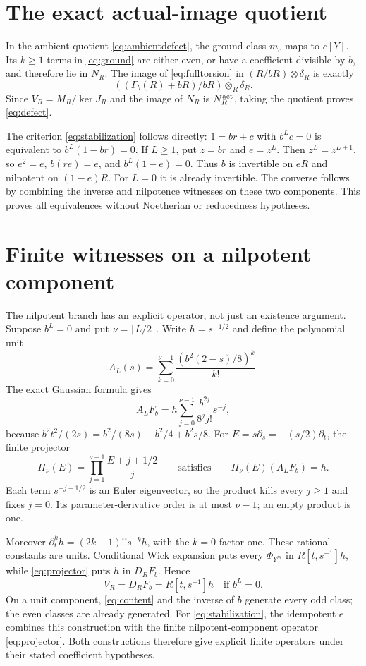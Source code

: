 \documentclass[11pt]{article}
\theoremstyle{definition}\newtheorem{definition}[theorem]{Definition}
\theoremstyle{remark}\newtheorem{remark}[theorem]{Remark}
\begin{document}
\section{The exact actual-image quotient}

In the ambient quotient \eqref{eq:ambientdefect}, the ground
class $m_c$ maps to $c[Y]$. Its $k\ge1$ terms in
\eqref{eq:ground} are either even, or have a coefficient
divisible by $b$, and therefore lie in $N_R$.
The image of \eqref{eq:fulltorsion} in
$(R/bR)\otimes\delta_R$ is exactly
\[
 ((\Gamma_b(R)+bR)/bR)\otimes_R\delta_R.
\]
Since $V_R=M_R/\ker J_R$ and the image of $N_R$ is
$N_R^{\rm act}$, taking the quotient proves
\eqref{eq:defect}.

The criterion \eqref{eq:stabilization} follows directly:
$1=br+c$ with $b^Lc=0$ is equivalent to
$b^L(1-br)=0$. If $L\ge1$, put $z=br$ and $e=z^L$.
Then $z^L=z^{L+1}$, so $e^2=e$, $b(re)=e$, and
$b^L(1-e)=0$. Thus $b$ is invertible on $eR$ and nilpotent
on $(1-e)R$. For $L=0$ it is already invertible. The converse
follows by combining the inverse and nilpotence witnesses on
these two components. This proves all equivalences without
Noetherian or reducedness hypotheses.

\section{Finite witnesses on a nilpotent component}

The nilpotent branch has an explicit operator, not just an
existence argument. Suppose $b^L=0$ and put
$\nu=\lceil L/2\rceil$. Write $h=s^{-1/2}$ and define the
polynomial unit
\[
 A_L(s)=\sum_{k=0}^{\nu-1}\frac{(b^2(2-s)/8)^k}{k!}.
\]
The exact Gaussian formula gives
\[
 A_LF_b=h\sum_{j=0}^{\nu-1}\frac{b^{2j}}{8^jj!}s^{-j},
\]
because $b^2t^2/(2s)=b^2/(8s)-b^2/4+b^2s/8$.
For $E=s\partial_s=-(s/2)\partial_t$, the finite projector
\begin{equation}\label{eq:projector}
 \Pi_\nu(E)=\prod_{j=1}^{\nu-1}\frac{E+j+1/2}{j}
 \qquad\text{satisfies}\qquad
 \Pi_\nu(E)(A_LF_b)=h.
\end{equation}
Each term $s^{-j-1/2}$ is an Euler eigenvector, so the product
kills every $j\ge1$ and fixes $j=0$. Its parameter-derivative
order is at most $\nu-1$; an empty product is one.

Moreover
$\partial_t^kh=(2k-1)!!s^{-k}h$, with the $k=0$ factor one.
These rational constants are units. Conditional Wick expansion
puts every $\Phi_{Y^m}$ in $R[t,s^{-1}]h$, while
\eqref{eq:projector} puts $h$ in $D_RF_b$. Hence
\[
 V_R=D_RF_b=R[t,s^{-1}]h\quad\text{if }b^L=0.
\]
On a unit component, \eqref{eq:content} and the inverse of $b$
generate every odd class; the even classes are already generated.
For \eqref{eq:stabilization}, the idempotent $e$ combines this
construction with the finite nilpotent-component operator
\eqref{eq:projector}. Both constructions therefore give explicit
finite operators under their stated coefficient hypotheses.
\end{document}
